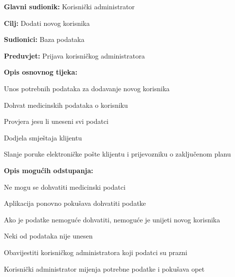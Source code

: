 			\begin{packed_item}
				
				\item \textbf{Glavni sudionik: }Korisnički administrator
				\item  \textbf{Cilj:} Dodati novog korisnika
				\item  \textbf{Sudionici:} Baza podataka
				\item  \textbf{Preduvjet:} Prijava korisničkog administratora
				\item  \textbf{Opis osnovnog tijeka:}
				
				\item[] \begin{packed_enum}
					
					\item Unos potrebnih podataka za dodavanje novog korisnika
					\item Dohvat medicinskih podataka o korisniku
					\item Provjera jesu li uneseni svi podatci
					\item Dodjela smještaja klijentu
					\item Slanje poruke elektroničke pošte klijentu i prijevozniku o zaključenom planu 

				\end{packed_enum}
				
				\item  \textbf{Opis mogućih odstupanja:}
				
				\item[] \begin{packed_item}
					
					\item[2.b] Ne mogu se dohvatiti medicinski podatci
					\item[] \begin{packed_enum}
						
						\item Aplikacija ponovno pokušava dohvatiti podatke
						\item Ako je podatke nemoguće dohvatiti, nemoguće je unijeti novog korisnika
						
					\end{packed_enum}
					
					\item[3.a] Neki od podataka nije unesen
					\item[] \begin{packed_enum}
						
						\item Obavijestiti korisničkog administratora koji podatci su prazni
						\item Korisnički administrator mijenja potrebne podatke i pokušava opet
						
					\end{packed_enum}
					
				\end{packed_item}
			\end{packed_item}
			
